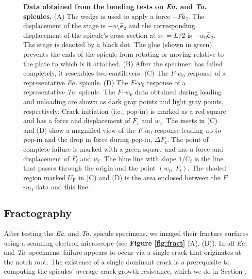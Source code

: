 \documentclass[12pt,onecolumn]{article}
\makeatletter
\DeclareRobustCommand*{\nameref}[1]{%
      \emph{\myorg@nameref{#1}}%
    }%
\newcommand{\ey}{\hat{\mathbf{e}}_2}
\newcommand{\TA}{\textit{Ta.\@}\xspace}
\newcommand{\EA}{\textit{Ea.\@}\xspace}
\makeatother
\begin{document}
\begin{figure}[ht!]
			\caption{\textbf{Data obtained from the bending tests on \EA and \TA spicules.} (A) The wedge is used to apply a force $-F\ey$. The displacement of the stage is $-w_\mathrm{s}\ey$ and the corresponding displacement of the spicule's cross-section at $x_1=L/2$ is $-w_0\ey$. The stage is denoted by a black dot. The glue (shown in green) prevents the ends of the spicule from rotating or moving relative to the plate to which is it attached. (B) After the specimen has failed completely, it resembles two cantilevers. (C) The $F$-$w_0$ response of a representative \EA spicule. (D) The $F$-$w_0$ response of a representative \TA spicule. The $F$--$w_0$ data obtained during loading and unloading are shown as dark gray points and light gray points, respectively. Crack initiation (i.e., pop-in) is marked as a red square and has a force and displacement of $F_\mathrm{c}$ and $w_\mathrm{c}$. The insets in (C) and (D) show a magnified view of the $F$-$w_0$ response leading up to pop-in and the drop in force during pop-in, $\Delta F_\mathrm{c}$. The point of complete failure is marked with a green square and has a force and displacement of $F_\mathrm{f}$ and $w_\mathrm{f}$. The blue line with slope $1/C_\mathrm{f}$ is the line that passes through the origin and the point $(w_\mathrm{f},\; F_\mathrm{f})$. The shaded region marked $U_\mathrm{F}$ in (C) and (D) is the area enclosed between the $F$-$w_0$ data and this line.
			}
			\label{fig:test}
			\end{figure}
 			
			
\subsection*{Fractography}
\label{sec:fracto}
 After testing the \EA and \TA spicule specimens, we imaged their fracture surfaces using a scanning electron microscope (see {\bf Figure \ref{fig:fract}} (A), (B)). In all \EA and \TA specimens, failure appears to occur via a single crack that originates at the notch root. The existence of a single dominant crack is a prerequisite to computing the spicules' average crack growth resistance, which we do in Section \nameref{sec:avgR}. 
 
\end{document}
